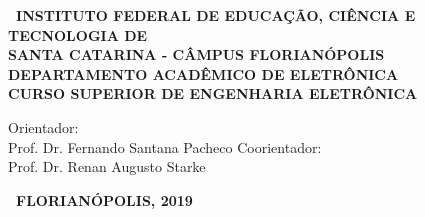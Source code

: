 \documentclass{ifscTCC} %
\begin{document}
\begin{capa}%
    \begin{SingleSpacing}
        \center
        \ABNTEXchapterfont\bfseries\ INSTITUTO FEDERAL DE EDUCAÇÃO, CIÊNCIA E TECNOLOGIA DE\\SANTA CATARINA - CÂMPUS FLORIANÓPOLIS\\DEPARTAMENTO ACADÊMICO DE ELETRÔNICA\\CURSO SUPERIOR DE ENGENHARIA ELETRÔNICA
        
        \vspace*{3.0cm}     %
        
        \ABNTEXchapterfont\bfseries\MakeUppercase\imprimirautor
        
        \vspace*{\fill} 
            \begin{center}
                \ABNTEXchapterfont\SingleSpacing\bfseries\Large\MakeUppercase\imprimirtitulo
            \end{center}
        \vspace*{\fill} 
        
        \hspace{.45\textwidth}
        \begin{minipage}{.5\textwidth}
            \begin{SingleSpacing}
                \normalfont\imprimirpreambulo
                \vspace*{1.0cm}
                
                Orientador:\\Prof. Dr. Fernando Santana Pacheco
                Coorientador:\\Prof. Dr. Renan Augusto Starke
            \end{SingleSpacing}
        \end{minipage}%
        \vspace*{\fill} 
        
        \begin{center}
            \ABNTEXchapterfont\bfseries\ FLORIANÓPOLIS, 2019
        \end{center}
    \end{SingleSpacing}
\end{capa}
\end{document}
